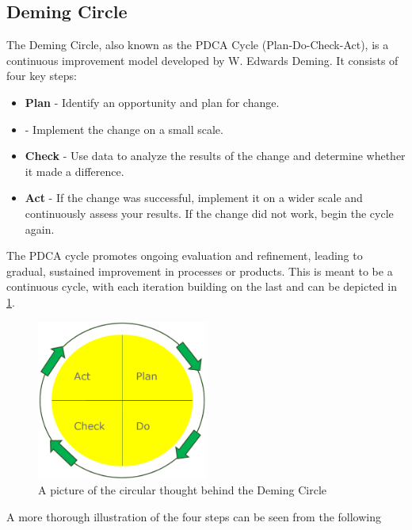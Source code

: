 \subsection{Deming Circle}
The Deming Circle, also known as the PDCA Cycle (Plan-Do-Check-Act), is a continuous improvement model developed by W. Edwards Deming. It consists of four key steps:

\begin{highlight}
    \begin{itemize}
        \item \textbf{Plan} - Identify an opportunity and plan for change.
        \item {} - Implement the change on a small scale.
        \item \textbf{Check} - Use data to analyze the results of the change and determine whether it made a difference.
        \item \textbf{Act} - If the change was successful, implement it on a wider scale and continuously assess your results. If the change did not work, begin the cycle again.
    \end{itemize}
\end{highlight}

The PDCA cycle promotes ongoing evaluation and refinement, leading to gradual, sustained improvement in processes or products. This is meant to be a continuous cycle, with each iteration building on the last and can be depicted in \ref{fig:demingcircle}.

\begin{figure}
    \centering
    \includegraphics[width=0.5\textwidth]{Figures/DemingCircle.png}
    \caption{A picture of the circular thought behind the Deming Circle}
    \label{fig:demingcircle}
\end{figure}

A more thorough illustration of the four steps can be seen from the following 

